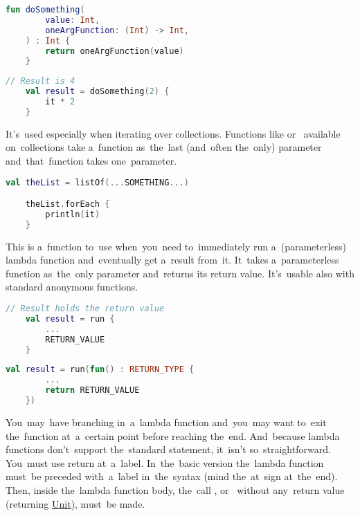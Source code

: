 \example
\begin{lstlisting}[language=Kotlin, title={Function taking other function as the~last parameter, that one takes one parameter}]
    fun doSomething(
        value: Int,
        oneArgFunction: (Int) -> Int,
    ) : Int {
        return oneArgFunction(value)
    }
\end{lstlisting}
\begin{lstlisting}[language=Kotlin, title={Usage}]
    // Result is 4
    val result = doSomething(2) {
        it * 2
    }
\end{lstlisting}
\newline

\noindent It's~used especially when iterating over collections.
Functions like  or~ available on~collections take a~function as~the~last (and~often the~only) parameter and~that~function takes one~parameter.

\begin{lstlisting}[language=Kotlin]
    val theList = listOf(...SOMETHING...)

    theList.forEach {
        println(it)
    }
\end{lstlisting}

\label{kotlinrun}
This is a~function to~use when~you~need to~immediately run a~(parameterless) lambda function and~eventually get a~result from~it.
It~takes a~parameterless function as~the~only parameter and~returns its return value.
It's~usable also with standard anonymous functions.
\newpage

\begin{lstlisting}[language=Kotlin, title={\textit{Run} with lambda function}]
    // Result holds the return value
    val result = run {
        ...
        RETURN_VALUE
    }
\end{lstlisting}
\begin{lstlisting}[language=Kotlin, title={Equivalent with standard anonymous function}]
    val result = run(fun() : RETURN_TYPE {
        ...
        return RETURN_VALUE
    })
\end{lstlisting}

\label{kotlinreturnatlabel}
You~may~have  branching in~a~lambda function and~you~may want to~exit the~function at~a~certain point before reaching the~end.
And~because lambda functions don't~support the~standard  statement, it~isn't so~straightforward.
You~must use return at~a~label.
In~the~basic version the~lambda function must~be preceded with~a~label in~the~syntax  (mind the~at~sign at~the~end).
Then, inside the~lambda function body, the~call , or~ without any~return value (returning \hyperref[kotlinunit]{Unit}), must~be made.

